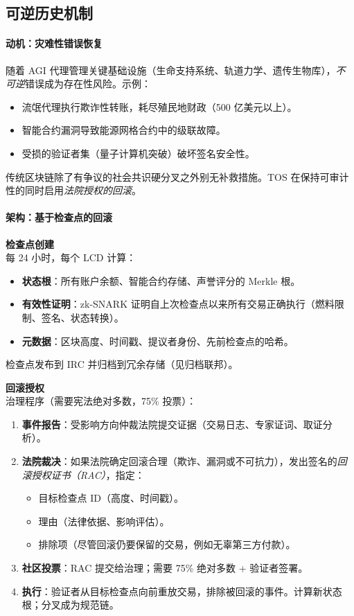 \documentclass[11pt]{article}
\begin{document}
\subsection{可逆历史机制}

\paragraph{动机：灾难性错误恢复}
随着 AGI 代理管理关键基础设施（生命支持系统、轨道力学、遗传生物库），\emph{不可逆}错误成为存在性风险。示例：
\begin{itemize}[noitemsep]
  \item 流氓代理执行欺诈性转账，耗尽殖民地财政（500 亿美元以上）。
  \item 智能合约漏洞导致能源网格合约中的级联故障。
  \item 受损的验证者集（量子计算机突破）破坏签名安全性。
\end{itemize}
传统区块链除了有争议的社会共识硬分叉之外别无补救措施。TOS 在保持可审计性的同时启用\emph{法院授权的回滚}。

\paragraph{架构：基于检查点的回滚}
\textbf{检查点创建}\\
每 24 小时，每个 LCD 计算：
\begin{itemize}[noitemsep]
  \item \textbf{状态根}：所有账户余额、智能合约存储、声誉评分的 Merkle 根。
  \item \textbf{有效性证明}：zk-SNARK 证明自上次检查点以来所有交易正确执行（燃料限制、签名、状态转换）。
  \item \textbf{元数据}：区块高度、时间戳、提议者身份、先前检查点的哈希。
\end{itemize}
检查点发布到 IRC 并归档到冗余存储（见归档联邦）。

\textbf{回滚授权}\\
治理程序（需要宪法绝对多数，75\% 投票）：
\begin{enumerate}[noitemsep]
  \item \textbf{事件报告}：受影响方向仲裁法院提交证据（交易日志、专家证词、取证分析）。
  \item \textbf{法院裁决}：如果法院确定回滚合理（欺诈、漏洞或不可抗力），发出签名的\emph{回滚授权证书（RAC）}，指定：
    \begin{itemize}[noitemsep]
      \item 目标检查点 ID（高度、时间戳）。
      \item 理由（法律依据、影响评估）。
      \item 排除项（尽管回滚仍要保留的交易，例如无辜第三方付款）。
    \end{itemize}
  \item \textbf{社区投票}：RAC 提交给治理；需要 75\% 绝对多数 + 验证者签署。
  \item \textbf{执行}：验证者从目标检查点向前重放交易，排除被回滚的事件。计算新状态根；分叉成为规范链。
\end{enumerate}
\end{document}
